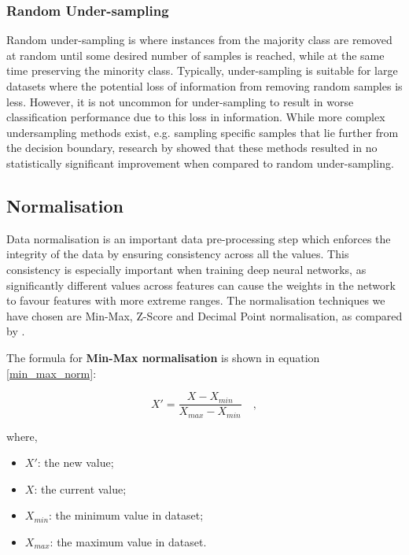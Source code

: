             \subsubsection{Random Under-sampling} \label{under_sampling}
                Random under-sampling is where instances from the majority class are removed at random until some desired number of samples is reached, while at the same time preserving the minority class. Typically, under-sampling is suitable for large datasets where the potential loss of information from removing random samples is less. However, it is not uncommon for under-sampling to result in worse classification performance due to this loss in information. While more complex undersampling methods exist, e.g. sampling specific samples that lie further from the decision boundary, research by \cite{imbalance_methods_3} showed that these methods resulted in no statistically significant improvement when compared to random under-sampling.
                
                
                
    
                
        \subsection{Normalisation} \label{normalisation}
            Data normalisation is an important data pre-processing step which enforces the integrity of the data by ensuring consistency across all the values. This consistency is especially important when training deep neural networks, as significantly different values across features can cause the weights in the network to favour features with more extreme ranges. The normalisation techniques we have chosen are Min-Max, Z-Score and Decimal Point normalisation, as compared by \cite{normalisation_comparison}.
            
            \noindent The formula for \textbf{Min-Max normalisation} is shown in equation \ref{min_max_norm}: 
            
                \begin{equation} \label{min_max_norm}
                    X' = \frac{X - X _{min}}{X _{max} - X _{min}} \quad ,
                \end{equation}
                \begin{adjustwidth}{2.5em}{0pt}
                    where,
                    \begin{itemize}[label=]
                        \item $X'$: the new value;
                        \item $X$: the current value;
                        \item $X _{min}$: the minimum value in dataset;
                        \item $X _{max}$: the maximum value in dataset.
                    \end{itemize}
                \end{adjustwidth}
            
